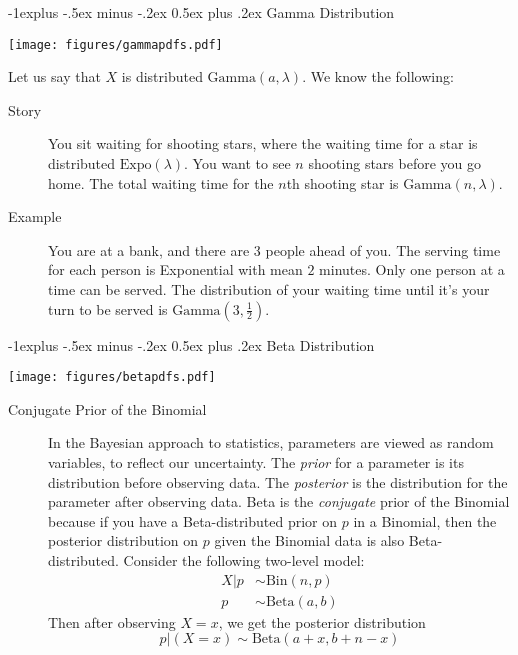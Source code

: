 \documentclass[10pt,landscape]{article}
\makeatletter
\newcommand{\Bin}{\textrm{Bin}}
\newcommand{\Beta}{\textrm{Beta}}
\newcommand{\Gam}{\textrm{Gamma}}
\newcommand{\Expo}{\textrm{Expo}}
\renewcommand{\subsection}{\@startsection{subsection}{2}{0mm}%
                                {-1explus -.5ex minus -.2ex}%
                                {0.5ex plus .2ex}%
                                {\normalfont\normalsize\bfseries}}
\makeatother
\begin{document}
\begin{multicols*}{3}
\subsection{Gamma Distribution}
\begin{minipage}{\linewidth}
            \centering
\texttt{[image: figures/gammapdfs.pdf]}
        \end{minipage}
\medskip
Let us say that $X$ is distributed $\Gam(a, \lambda)$. We know the following:
\begin{description}
    \item[Story] You sit waiting for shooting stars, where the waiting time for a star is distributed $\Expo(\lambda)$. You want to see $n$ shooting stars before you go home. The total waiting time for the $n$th shooting star is $\Gam(n,\lambda)$.
    \item[Example]  You are at a bank, and there are 3 people ahead of you. The serving time for each person is Exponential with mean $2$ minutes. Only one person at a time can be served. The distribution of your waiting time until it's your turn to be served is $\Gam(3, \frac{1}{2})$.

\end{description}

\subsection{Beta Distribution}
\begin{minipage}{\linewidth}
            \centering
\texttt{[image: figures/betapdfs.pdf]}
        \end{minipage}
\medskip

\begin{description}

\item[Conjugate Prior of the Binomial] In the Bayesian approach to statistics, parameters are viewed as random variables, to reflect our uncertainty. The \emph{prior} for a parameter is its distribution before observing data. The \emph{posterior}  is the distribution for the parameter after observing data. Beta is the \emph{conjugate} prior of the Binomial because if you have a Beta-distributed prior on $p$ in a Binomial, then the posterior distribution on $p$ given the Binomial data is also Beta-distributed. Consider the following two-level model:
    \begin{align*}
        X|p &\sim \Bin(n, p) \\
        p &\sim \Beta(a, b)
    \end{align*}
Then after observing  $X = x$, we get the posterior distribution
\[p|(X=x) \sim \Beta(a + x, b + n - x) \]


\end{description}
\end{multicols*}
\end{document}
